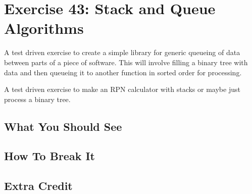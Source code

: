 \chapter{Exercise 43: Stack and Queue Algorithms}

A test driven exercise to create a simple library for generic queueing of data between
parts of a piece of software.  This will involve filling a binary tree with data
and then queueing it to another function in sorted order for processing.

A test driven exercise to make an RPN calculator with stacks or maybe just
process a binary tree.


\section{What You Should See}


\section{How To Break It}


\section{Extra Credit}



